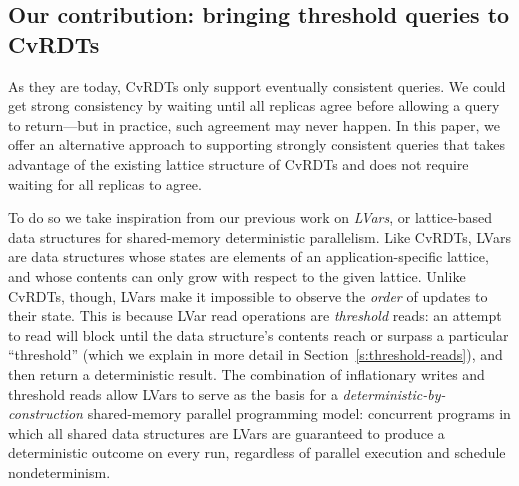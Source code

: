 \subsection{Our contribution: bringing threshold queries to CvRDTs}

As they are today, CvRDTs only support eventually consistent queries.
We could get strong consistency by waiting until all replicas agree
before allowing a query to return---but in practice, such agreement
may never happen.  In this paper, we offer an alternative approach to
supporting strongly consistent queries that takes advantage of the
existing lattice structure of CvRDTs and does not require waiting for
all replicas to agree.

To do so we take inspiration from
our previous work \cite{LVars-paper,Freeze-paper,effectzoo} on \emph{LVars}, or
lattice-based data structures for shared-memory deterministic parallelism.  
Like CvRDTs, LVars are data structures whose states are elements of an
application-specific lattice, and whose contents can only grow with
respect to the given lattice.
Unlike CvRDTs, though, LVars make it impossible to observe the
\emph{order} of updates to their state.  This is because LVar read
operations are \emph{threshold} reads: an attempt to read will block
until the data structure's contents reach or surpass a particular
``threshold'' (which we explain in more detail in Section~\ref{s:threshold-reads}), 
and then return a deterministic result.
The combination of inflationary writes and threshold reads
allow LVars to serve as the basis for a
\emph{deterministic-by-construction} shared-memory parallel
programming model: concurrent programs in which all
shared data structures are LVars are guaranteed to produce a
deterministic outcome on every run, regardless of parallel execution
and schedule nondeterminism. 

